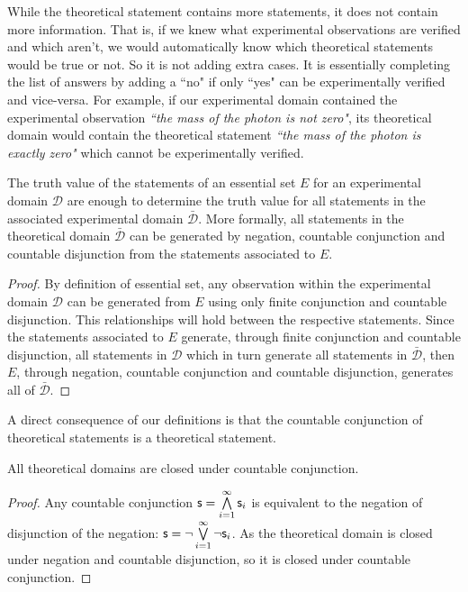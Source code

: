 \documentclass[11pt,letterpaper,fleqn]{memoir} %
\begin{document}
While the theoretical statement contains more statements, it does not contain more information. That is, if we knew what experimental observations are verified and which aren't, we would automatically know which theoretical statements would be true or not. So it is not adding extra cases. It is essentially completing the list of answers by adding a ``no" if only ``yes" can be experimentally verified and vice-versa. For example, if our experimental domain contained the experimental observation \emph{``the mass of the photon is not zero"}, its theoretical domain would contain the theoretical statement \emph{``the mass of the photon is exactly zero"} which cannot be experimentally verified.

\begin{mathSection}
\begin{prop}
	The truth value of the statements of an essential set $E$ for an experimental domain $\mathcal{D}$ are enough to determine the truth value for all statements in the associated experimental domain $\bar{\mathcal{D}}$. More formally, all statements in the theoretical domain $\bar{\mathcal{D}}$ can be generated by negation, countable conjunction and countable disjunction from the statements associated to $E$.
\end{prop}

\begin{proof}
	By definition of essential set, any observation within the experimental domain $\mathcal{D}$ can be generated from $E$ using only finite conjunction and countable disjunction. This relationships will hold between the respective statements. Since the statements associated to $E$ generate, through finite conjunction and countable disjunction, all statements in $\mathcal{D}$ which in turn generate all statements in $\bar{\mathcal{D}}$, then $E$, through negation, countable conjunction and countable disjunction, generates all of $\bar{\mathcal{D}}$.
\end{proof}
\end{mathSection}

A direct consequence of our definitions is that the countable conjunction of theoretical statements is a theoretical statement.

\begin{mathSection}
	\begin{prop}
		All theoretical domains are closed under countable conjunction.
	\end{prop}

\begin{proof}
	Any countable conjunction $\mathsf{s} = \bigwedge\limits_{i=1}^{\infty} \mathsf{s}_i$ is equivalent to the negation of disjunction of the negation: $\mathsf{s} = \neg\bigvee\limits_{i=1}^{\infty} \neg\mathsf{s}_i$. As the theoretical domain is closed under negation and countable disjunction, so it is closed under countable conjunction.  
\end{proof}

\end{mathSection}
\end{document}
